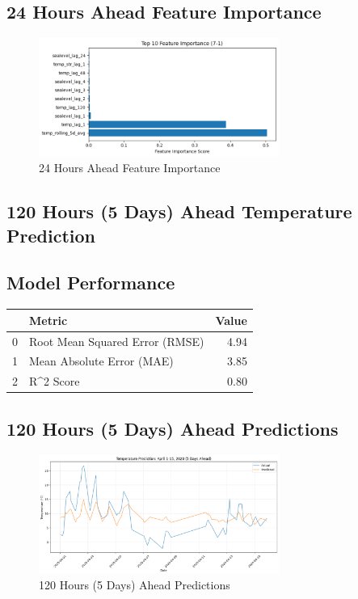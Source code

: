 \subsection{24 Hours Ahead Feature Importance}
\begin{figure}[htbp]
\centering
\includegraphics[width=0.7\textwidth]{7-1-random_forest_temp_feature_importance.png}
\caption{24 Hours Ahead Feature Importance}
\label{fig:24_hours_ahead_featimp}
\end{figure}



\subsection{120 Hours (5 Days) Ahead Temperature Prediction}
\subsection{Model Performance}
\begin{tabular}{llr}
\toprule
 & Metric & Value \\
\midrule
0 & Root Mean Squared Error (RMSE) & 4.94 \\
1 & Mean Absolute Error (MAE) & 3.85 \\
2 & R^2 Score & 0.80 \\
\bottomrule
\end{tabular}

\subsection{120 Hours (5 Days) Ahead Predictions}
\begin{figure}[htbp]
\centering
\includegraphics[width=0.7\textwidth]{7-2-random_forest_temp_prediction_results.png}
\caption{120 Hours (5 Days) Ahead Predictions}
\label{fig:120_hours_(5_days)_ahead_pred}
\end{figure}

